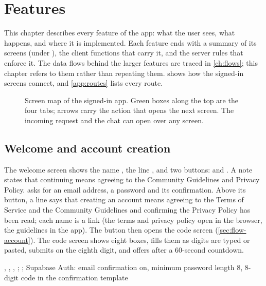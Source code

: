 \chapter{Features}
\label{ch:features}

This chapter describes every feature of the app: what the user sees, what happens, and where it is
implemented. Each feature ends with a summary of its screens (under ), the client functions
that carry it, and the server rules that enforce it. The data flows behind the larger features are traced
in \cref{ch:flows}; this chapter refers to them rather than repeating them.  shows
how the signed-in screens connect, and \cref{app:routes} lists every route.

\begin{figure}[ht]
  \centering
  
  \caption{Screen map of the signed-in app. Green boxes along the top are the four tabs; arrows carry the
    action that opens the next screen. The incoming request and the chat can open over any screen.}
  \label{fig:screen-map}
\end{figure}

\section{Welcome and account creation}
\label{sec:feature-signup}

The welcome screen shows the name , the line , and two
buttons:  and . A note states that continuing means agreeing to the
Community Guidelines and Privacy Policy.  asks for an email address, a password and its
confirmation. Above its button, a line says that creating an account means agreeing to the Terms of
Service and the Community Guidelines and confirming the Privacy Policy has been read; each name is a link
(the terms and privacy policy open in the browser, the guidelines in the app). The button then opens the
code screen (\cref{sec:flow-account}). The code screen shows eight boxes,
fills them as digits are typed or pasted, submits on the eighth digit, and offers  after
a 60-second countdown.

\implemented
  {, , }
  {, ; ; }
  {Supabase Auth: email confirmation on, minimum password length 8, 8-digit code in the confirmation template}

